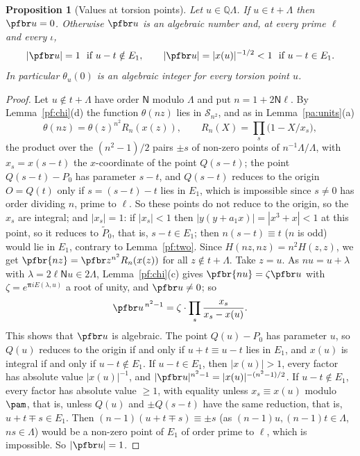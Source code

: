 \documentclass[10pt]{amsart}
\newtheorem{proposition}[theorem]{Proposition}
\theoremstyle{definition}
\theoremstyle{remark}
\newcommand{\Q}{\mathbb Q}
\begin{document}
\begin{proposition}[Values at torsion points]\label{pf:values}
Let $u\in\Q\Lambda$. If $u\in t+\Lambda$ then $\pfbr u=0$. Otherwise $\pfbr u$ is an algebraic
number and, at every prime $\ell$ and every $\iota$,
\[
|\pfbr u|=1\ \text{ if }u-t\notin E_1,\qquad|\pfbr u|=|x(u)|^{-1/2}<1\ \text{ if }u-t\in E_1 .
\]
In particular $\theta_u(0)$ is an algebraic integer for every torsion point $u$.
\end{proposition}
\begin{proof}
Let $u\notin t+\Lambda$ have order $\mathsf N$ modulo $\Lambda$ and put $n=1+2\mathsf N\ell$. By
Lemma~\ref{pf:chi}(d) the function $\theta(nz)$ lies in $\mathcal S_{n^2}$, and as in
Lemma~\ref{pa:units}(a)
\[
\theta(nz)=\theta(z)^{n^2}R_n(x(z)),\qquad R_n(X)=\prod_s\bigl(1-X/x_s\bigr),
\]
the product over the $(n^2-1)/2$ pairs $\pm s$ of non-zero points of $n^{-1}\Lambda/\Lambda$, with
$x_s=x(s-t)$ the $x$-coordinate of the point $Q(s-t)$; the point $Q(s-t)-P_0$ has parameter $s-t$,
and $Q(s-t)$ reduces to the origin $O=Q(t)$ only if $s=(s-t)-t$ lies in $E_1$, which is impossible since
$s\ne0$ has order dividing $n$, prime to $\ell$. So these points do not reduce to
the origin, so the $x_s$ are integral; and $|x_s|=1$: if $|x_s|<1$ then
$|y(y+a_1x)|=|x^3+x|<1$ at this point, so it reduces to $\widetilde P_0$, that is, $s-t\in E_1$; then $n(s-t)\equiv t$ ($n$ is odd)
would lie in $E_1$, contrary to Lemma~\ref{pf:two}. Since $H(nz,nz)=n^2H(z,z)$, we get
$\pfbr{nz}=\pfbr z^{n^2}R_n(x(z))$ for all $z\notin t+\Lambda$. Take $z=u$. As $nu=u+\lambda$ with
$\lambda=2\ell\mathsf Nu\in2\Lambda$, Lemma~\ref{pf:chi}(c) gives $\pfbr{nu}=\zeta\pfbr u$ with
$\zeta=e^{\boldsymbol\pi iE(\lambda,u)}$ a root of unity, and $\pfbr u\ne0$; so
\[
\pfbr u^{\,n^2-1}=\zeta\cdot\prod_s\frac{x_s}{x_s-x(u)} .
\]
This shows that $\pfbr u$ is algebraic. The point $Q(u)-P_0$ has parameter $u$, so $Q(u)$ reduces to the origin
if and only if $u+t\equiv u-t$ lies in $E_1$, and $x(u)$ is integral if and only if $u-t\notin E_1$. If $u-t\in E_1$, then $|x(u)|>1$, every
factor has absolute value $|x(u)|^{-1}$, and $|\pfbr u|^{n^2-1}=|x(u)|^{-(n^2-1)/2}$. If
$u-t\notin E_1$, every factor has absolute value $\ge1$, with equality unless $x_s\equiv x(u)$
modulo $\pam$, that is, unless $Q(u)$ and $\pm Q(s-t)$ have the same reduction, that is,
$u+t\mp s\in E_1$. Then $(n-1)(u+t\mp s)\equiv\pm s$ (as $(n-1)u,(n-1)t\in\Lambda$, $ns\in\Lambda$)
would be a non-zero point of
$E_1$ of order prime to $\ell$, which is impossible. So $|\pfbr u|=1$.
\end{proof}
\end{document}
